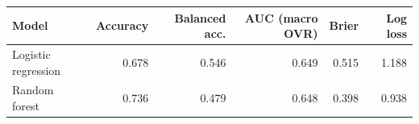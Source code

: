 \begin{tabular}{lrrrrr}
\toprule
Model & Accuracy & Balanced acc. & AUC (macro OVR) & Brier & Log loss \\
\midrule
Logistic regression & 0.678 & 0.546 & 0.649 & 0.515 & 1.188 \\
Random forest & 0.736 & 0.479 & 0.648 & 0.398 & 0.938 \\
\bottomrule
\end{tabular}

